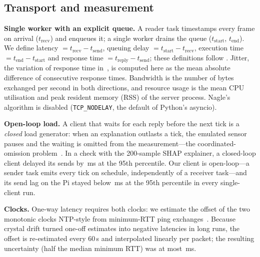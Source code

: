 \documentclass[conference]{IEEEtran}
\newcommand{\ms}{\,ms\xspace}
\begin{document}
\subsection{Transport and measurement}
\label{sec:transport}
\textbf{Single worker with an explicit queue.} A reader task timestamps
every frame on arrival ($t_\mathrm{recv}$) and enqueues it; a single worker
drains the queue ($t_\mathrm{start}$, $t_\mathrm{end}$). We define latency
$=t_\mathrm{recv}-t_\mathrm{send}$, queuing delay
$=t_\mathrm{start}-t_\mathrm{recv}$, execution time
$=t_\mathrm{end}-t_\mathrm{start}$ and response time
$=t_\mathrm{reply}-t_\mathrm{send}$; these definitions follow
\cite{erzurumluoglu2025}. Jitter, the variation of response time
in~\cite{erzurumluoglu2025}, is computed here as the mean absolute
difference of consecutive response times. Bandwidth is
the number of bytes exchanged per second in both directions, and resource
usage is the mean CPU utilisation and peak resident memory (RSS) of the
server process. Nagle's algorithm is disabled (\texttt{TCP\_NODELAY}, the
default of Python's asyncio).

\textbf{Open-loop load.} A client that waits for each reply before the
next tick is a \emph{closed} load generator: when an explanation outlasts
a tick, the emulated sensor pauses and the waiting is omitted from the
measurement---the coordinated-omission problem~\cite{schroeder2006}. In a check with the
200-sample SHAP explainer, a closed-loop client delayed its sends by
\LoopClosedLagPNF\ms at the 95th percentile. Our client is
open-loop---a sender task emits every tick on schedule, independently of
a receiver task---and its send lag on the Pi stayed below \PiLagPNFMax\ms
at the 95th percentile in every single-client run.

\textbf{Clocks.} One-way latency requires both clocks: we estimate the
offset of the two monotonic clocks NTP-style from minimum-RTT ping
exchanges~\cite{mills1991}. Because crystal drift turned one-off
estimates into negative latencies in long runs, the offset is
re-estimated every 60\,s and interpolated linearly per packet; the
resulting uncertainty (half the median minimum RTT) was at most
\ClockUncMax\ms.
\end{document}
